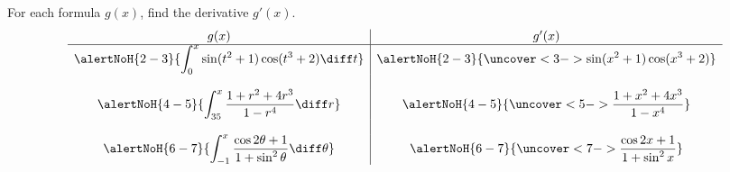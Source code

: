 \begin{frame}
\begin{example}
For each formula $g(x)$, find the derivative $g'(x)$.
\[
\begin{array}{c|c}
g(x) & g'(x) \\
\hline
\alertNoH{ 2-3}{\displaystyle \int_0^x \sin(t^2+1)\cos(t^3+2)\diff t} & %
\alertNoH{ 2-3}{\uncover<3->{\displaystyle \sin(x^2+1)\cos(x^3+2)}} \\%
 & \\
\alertNoH{ 4-5}{\displaystyle \int_{35}^x \frac{1+r^2+4r^3}{1-r^4}\diff r} & %
\alertNoH{ 4-5}{\uncover<5->{\displaystyle \frac{1+x^2+4x^3}{1-x^4}}} \\%
 & \\
\alertNoH{ 6-7}{\displaystyle \int_{-1}^x \frac{\cos 2\theta + 1}{1+\sin^2 \theta}\diff \theta} & %
\alertNoH{ 6-7}{\uncover<7->{\displaystyle \frac{\cos 2x + 1}{1+\sin^2 x}}}%
\end{array}
\]
\end{example}
\end{frame}
